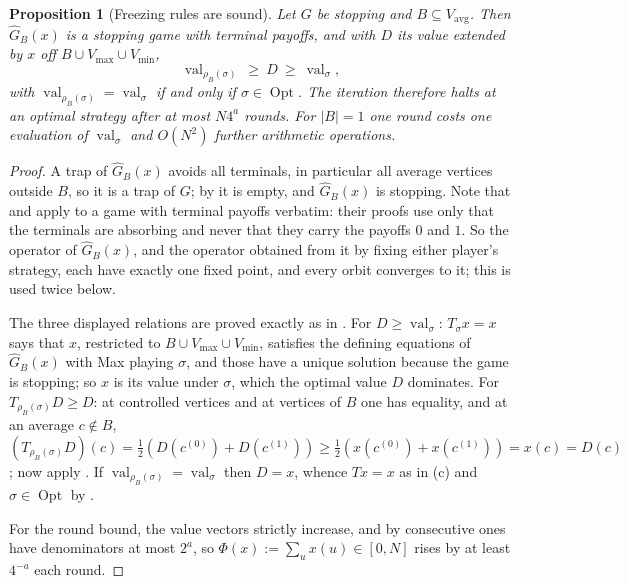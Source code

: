 \documentclass[11pt]{article}
\theoremstyle{plain}
\newtheorem{proposition}[theorem]{Proposition}
\theoremstyle{definition}
\DeclareMathOperator{\val}{val}
\DeclareMathOperator{\Opt}{Opt}
\newcommand{\Vmax}{V_{\max}}
\newcommand{\Vmin}{V_{\min}}
\newcommand{\Vavg}{V_{\mathrm{avg}}}
\begin{document}
\begin{proposition}[Freezing rules are sound]\label{prop:freeze-sound}
Let $G$ be stopping and $B\subseteq\Vavg$. Then $\widehat G_B(x)$ is a
stopping game with terminal payoffs, and with $D$ its value extended by
$x$ off $B\cup\Vmax\cup\Vmin$,
\[
  \val_{\rho_B(\sigma)}\ \ge\ D\ \ge\ \val_\sigma,
\]
with $\val_{\rho_B(\sigma)}=\val_\sigma$ if and only if $\sigma\in\Opt$.
The iteration therefore halts at an optimal strategy after at most
$N4^{a}$ rounds. For $|B|=1$ one round costs one evaluation of
$\val_\sigma$ and $O(N^{2})$ further arithmetic operations.
\end{proposition}

\begin{proof}
A trap of $\widehat G_B(x)$ avoids all terminals, in particular all
average vertices outside $B$, so it is a trap of $G$; by
 it is empty, and $\widehat G_B(x)$ is stopping. Note
that  and  apply to a game
with terminal payoffs verbatim: their proofs use only that the terminals
are absorbing and never that they carry the payoffs $0$ and $1$. So the
operator of $\widehat G_B(x)$, and the operator obtained from it by
fixing either player's strategy, each have exactly one fixed point, and
every orbit converges to it; this is used twice below.

The three displayed relations are proved exactly as in
. For $D\ge\val_\sigma$: $T_\sigma x=x$ says
that $x$, restricted to $B\cup\Vmax\cup\Vmin$, satisfies the defining
equations of $\widehat G_B(x)$ with Max playing $\sigma$, and those have
a unique solution because the game is stopping; so $x$ is its value under
$\sigma$, which the optimal value $D$ dominates. For
$T_{\rho_B(\sigma)}D\ge D$: at controlled vertices and at vertices of $B$
one has equality, and at an average $c\notin B$,
$(T_{\rho_B(\sigma)}D)(c)=\frac12(D(c^{(0)})+D(c^{(1)}))\ge
\frac12(x(c^{(0)})+x(c^{(1)}))=x(c)=D(c)$; now apply
. If $\val_{\rho_B(\sigma)}=\val_\sigma$ then
$D=x$, whence $Tx=x$ as in (c) and
$\sigma\in\Opt$ by .

For the round bound, the value vectors strictly increase, and by
 consecutive ones have denominators at most
$2^{a}$, so $\Phi(x):=\sum_{u}x(u)\in[0,N]$ rises by at least $4^{-a}$
each round.


\end{proof}
\end{document}
